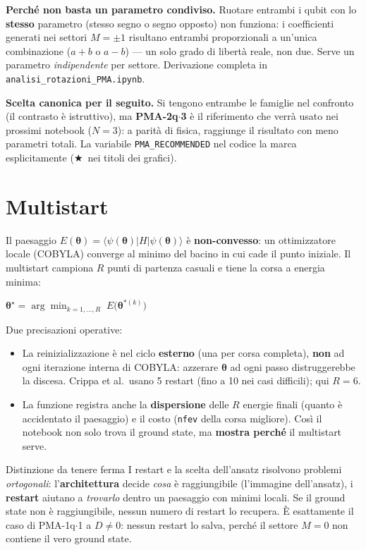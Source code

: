 \documentclass[11pt,a4paper]{article}
\begin{document}
\textbf{Perché non basta un parametro condiviso.} Ruotare entrambi i
qubit con lo \textbf{stesso} parametro (stesso segno o segno opposto)
non funziona: i coefficienti generati nei settori $M=\pm1$ risultano
entrambi proporzionali a un'unica combinazione ($a+b$ o $a-b$) --- un
solo grado di libertà reale, non due. Serve un parametro
\emph{indipendente} per settore. Derivazione completa in
\texttt{analisi\_rotazioni\_PMA.ipynb}.

\textbf{Scelta canonica per il seguito.} Si tengono entrambe le famiglie
nel confronto (il contrasto è istruttivo), ma \textbf{PMA-2q$\cdot$3} è
il riferimento che verrà usato nei prossimi notebook ($N=3$): a parità
di fisica, raggiunge il risultato con meno parametri totali. La
variabile \texttt{PMA\_RECOMMENDED} nel codice la marca esplicitamente
($\bigstar$\ nei titoli dei grafici).

\section{Multistart}

Il paesaggio
$E(\boldsymbol\theta)=\langle\psi(\boldsymbol\theta)|H|\psi(\boldsymbol\theta)\rangle$
è \textbf{non-convesso}: un ottimizzatore locale (COBYLA) converge al
minimo del bacino in cui cade il punto iniziale. Il multistart campiona
$R$ punti di partenza casuali e tiene la corsa a energia minima:
\begin{keyeq}
\centering
$\boldsymbol\theta^\star = \displaystyle\arg\min_{k=1,\dots,R}\; E\big(\boldsymbol\theta^{*(k)}\big)$
\end{keyeq}

Due precisazioni operative:
\begin{itemize}[leftmargin=1.3em,itemsep=0.25em]
\item La reinizializzazione è nel ciclo \textbf{esterno} (una per corsa
completa), \textbf{non} ad ogni iterazione interna di COBYLA: azzerare
$\boldsymbol\theta$ ad ogni passo distruggerebbe la discesa. Crippa et
al.\ usano 5 restart (fino a 10 nei casi difficili); qui $R=6$.
\item La funzione registra anche la \textbf{dispersione} delle $R$
energie finali (quanto è accidentato il paesaggio) e il costo
(\texttt{nfev} della corsa migliore). Così il notebook non solo trova
il ground state, ma \textbf{mostra perché} il multistart serve.
\end{itemize}

\begin{okbox}{Distinzione da tenere ferma}
I restart e la scelta dell'ansatz risolvono problemi \emph{ortogonali}:
l'\textbf{architettura} decide \emph{cosa} è raggiungibile (l'immagine
dell'ansatz), i \textbf{restart} aiutano a \emph{trovarlo} dentro un
paesaggio con minimi locali. Se il ground state non è raggiungibile,
nessun numero di restart lo recupera. È esattamente il caso di
PMA-1q$\cdot$1 a $D\neq0$: nessun restart lo salva, perché il settore
$M=0$ non contiene il vero ground state.
\end{okbox}
\end{document}
